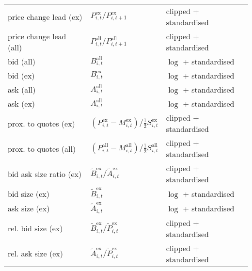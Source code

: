 \begin{table}[H]
\begin{threeparttable}
\begin{tabular}{@{}lll@{}}
            price change lead (ex)  & $P_{i, t}^{\text{ex}}/P_{i, t+1}^{\text{ex}}$\tnote{*}                                           & clipped + standardised          \\
            price change lead (all) & $P_{i, t}^{\text{all}}/P_{i, t+1}^{\text{all}}$\tnote{*}                                         & clipped + standardised          \\
            bid (all)               & $B_{i, t}^{\text{all}}$                                                                          & $\log$ + standardised          \\
            bid (ex)                & $B_{i, t}^{\text{ex}}$                                                                           & $\log$ + standardised          \\
            ask (all)               & $A_{i, t}^{\text{all}}$                                                                          & $\log$ + standardised          \\
            ask (ex)                & $A_{i, t}^{\text{all}}$                                                                          & $\log$ + standardised          \\
            prox. to quotes (ex)    & $\left(P_{i, t}^{\text{ex}}- M_{i, t}^{\text{ex}}\right) / \tfrac{1}{2} S_{i, t}^{\text{ex}}$    & clipped + standardised          \\
            prox. to quotes (all)   & $\left(P_{i, t}^{\text{all}}- M_{i, t}^{\text{all}}\right) / \tfrac{1}{2} S_{i, t}^{\text{all}}$ & clipped + standardised          \\
            bid ask size ratio (ex) & $\tilde{B}_{i, t}^{\text{ex}}/\tilde{A}_{i, t}^{\text{ex}}$                                      & clipped + standardised          \\
            bid size (ex)           & $\tilde{B}_{i, t}^{\text{ex}}$                                                                   & $\log$ + standardised          \\
            ask size (ex)           & $\tilde{A}_{i, t}^{\text{ex}}$                                                                   & $\log$ + standardised          \\
            rel. bid size (ex)      & $\tilde{B}_{i, t}^{\text{ex}}/\tilde{P}_{i, t}^{\text{ex}}$                                      & clipped + standardised           \\
            rel. ask size (ex)      & $\tilde{A}_{i, t}^{\text{ex}}/\tilde{P}_{i, t}^{\text{ex}}$                                      & clipped + standardised           \\

\end{tabular}
\end{threeparttable}
\end{table}
